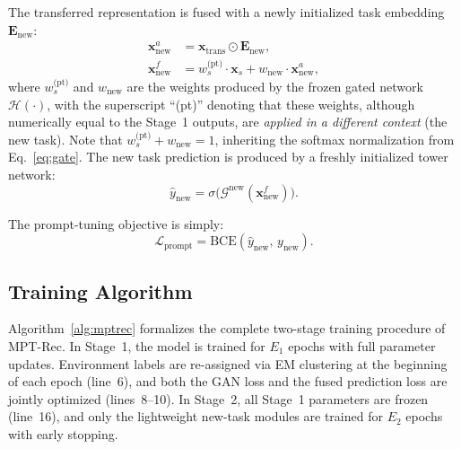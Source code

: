 \documentclass[review,anonymous]{acmart}
\begin{document}
The transferred representation is fused with a newly initialized task embedding
$\mathbf{E}_{\text{new}}$:
\begin{align}
  \mathbf{x}_{\text{new}}^a &= \mathbf{x}_{\text{trans}} \odot \mathbf{E}_{\text{new}}, \label{eq:new_task_aware} \\
  \mathbf{x}_{\text{new}}^f &= w_s^{\text{(pt)}} \cdot \mathbf{x}_s + w_{\text{new}} \cdot \mathbf{x}_{\text{new}}^a, \label{eq:new_fusion}
\end{align}
where $w_s^{\text{(pt)}}$ and $w_{\text{new}}$ are the weights produced by the
frozen gated network $\mathcal{H}(\cdot)$, with the superscript ``(pt)'' denoting
that these weights, although numerically equal to the Stage~1 outputs, are
\emph{applied in a different context} (the new task). Note that
$w_s^{\text{(pt)}} + w_{\text{new}} = 1$, inheriting the softmax normalization
from Eq.~\eqref{eq:gate}. The new task
prediction is produced by a freshly initialized tower network:
\begin{equation}
  \hat{y}_{\text{new}} = \sigma\big(\mathcal{G}^{\text{new}}(\mathbf{x}_{\text{new}}^f)\big).
  \label{eq:new_prediction}
\end{equation}

The prompt-tuning objective is simply:
\begin{equation}
  \mathcal{L}_{\text{prompt}} = \text{BCE}(\hat{y}_{\text{new}},\, y_{\text{new}}).
  \label{eq:prompt_loss}
\end{equation}

\subsection{Training Algorithm}

Algorithm~\ref{alg:mptrec} formalizes the complete two-stage training procedure
of MPT-Rec. In Stage~1, the model is trained for $E_1$ epochs with full parameter
updates. Environment labels are re-assigned via EM clustering at the beginning of
each epoch (line~6), and both the GAN loss and the fused prediction loss are
jointly optimized (lines~8--10). In Stage~2, all Stage~1 parameters are frozen
(line~16), and only the lightweight new-task modules are trained for $E_2$
epochs with early stopping.
\end{document}
